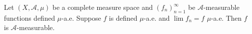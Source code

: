 Let $(X, \mathcal{A}, \mu)$ be a complete measure space and $(f_n)_{n=1}^{\infty}$ be $\mathcal{A}$-measurable functions defined $\mu$-a.e. Suppose $f$ is defined $\mu$-a.e. and $\lim f_n = f$ $\mu$-a.e. Then $f$ is $\mathcal{A}$-measurable.